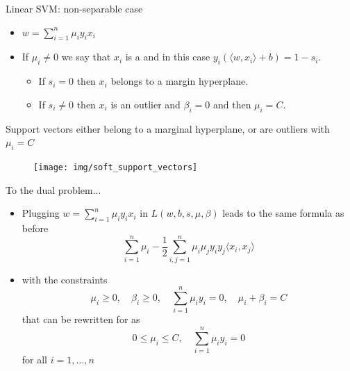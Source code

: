 \documentclass[xcolor={usenames,dvipsnames}]{beamer}
\begin{document}
\begin{frame}{Linear SVM: non-separable case}
  \begin{itemize}
    \item $w = \sum_{i=1}^n \mu_i y_i x_i$

\vspace{.3cm}

    \item If $\mu_i \neq 0$ we say that $x_i$ is a  and in this case $y_i(\langle {w, x_i} \rangle  + b) = 1 - s_i$.

\vspace{.3cm}

    \begin{itemize}
      \item If $s_i = 0$ then $x_i$ belongs to a margin hyperplane.

\vspace{.2cm}

      \item If $s_i \neq 0$ then $x_i$ is an outlier and $\beta_i = 0$ and then $\mu_i = C$.
    \end{itemize}
  \end{itemize}

  \begin{alertblock}{}
  Support vectors either belong to a marginal hyperplane, or are outliers with $\mu_i = C$
  \end{alertblock}

  \begin{figure}
 	\begin{center}
 		\texttt{[image: img/soft\_support\_vectors]}
	\end{center} 	 
  \end{figure}
\end{frame}


\begin{frame}{To the dual problem...}
  \begin{itemize}
    \item Plugging $w = \sum_{i=1}^n \mu_i y_i x_i$ in $L(w, b, s, 
    \mu, \beta)$ leads to the same formula as before
    \begin{equation*}
      \sum_{i=1}^n \mu_i - \frac 12 \sum_{i, j=1}^n \mu_i \mu_j y_i 
      y_j \langle {x_i, x_j} \rangle 
    \end{equation*}
    \pause
    \item with the constraints
    \begin{equation*}
      \mu_i \geq 0, \quad \beta_i \geq 0, \quad  
      \sum_{i=1}^n \mu_i y_i  = 0, \quad \mu_i + \beta_i = C
    \end{equation*}
    that can be rewritten for as
    \begin{equation*}
      0 \leq \mu_i \leq C, \quad  
      \sum_{i=1}^n \mu_i y_i  = 0
    \end{equation*}
    for all $i=1, \ldots, n$
  \end{itemize}
  \end{frame}
\end{document}
